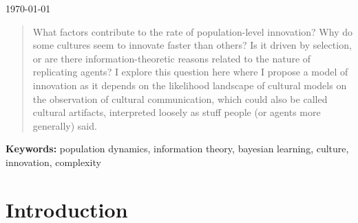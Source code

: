 \documentclass[11pt]{amsart}
\begin{document}
\title{}
\author[Turner]{Matthew A.~Turner}

\address{$^1$Cognitive and Information Sciences, University of California, Merced, Merced, CA, USA}

\date{\today}

\maketitle


{\vspace{-6pt}\footnotesize\begin{center}\today\end{center}\vspace{12pt}}

\linenumbers
\modulolinenumbers[3]


\begin{abstract}
\noindent \small
  What factors contribute to the rate of population-level innovation? Why do
  some cultures seem to innovate faster than others? Is it driven by selection,
  or are there information-theoretic reasons related to the nature of 
  replicating agents? I explore this question here where I propose a model
  of innovation as it depends on the likelihood landscape of cultural models
  on the observation of cultural communication, which could also be called
  cultural artifacts, interpreted loosely as stuff people (or agents more generally)
  said. 
\end{abstract}

\doublespacing

\vspace{12pt}

\noindent \textbf{Keywords:} population dynamics, information theory, 
bayesian learning, culture, innovation, complexity


\section{Introduction}
\end{document}
